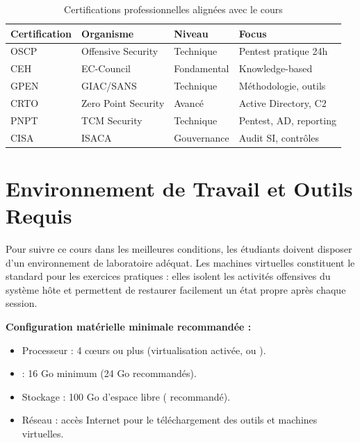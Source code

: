 \begin{table}[htbp]
\centering
\caption{Certifications professionnelles alignées avec le cours}
\label{tab:certifications}
\begin{tabular}{llll}
\toprule
\textbf{Certification} & \textbf{Organisme} & \textbf{Niveau} & \textbf{Focus} \\
\midrule
OSCP   & Offensive Security & Technique    & Pentest pratique 24h \\
CEH    & EC-Council         & Fondamental  & Knowledge-based \\
GPEN   & GIAC/SANS          & Technique    & Méthodologie, outils \\
CRTO   & Zero Point Security & Avancé      & Active Directory, C2 \\
PNPT   & TCM Security       & Technique    & Pentest, AD, reporting \\
CISA   & ISACA              & Gouvernance  & Audit SI, contrôles \\
\bottomrule
\end{tabular}
\end{table}

\section*{Environnement de Travail et Outils Requis}

Pour suivre ce cours dans les meilleures conditions, les étudiants doivent disposer
d'un environnement de laboratoire adéquat. Les machines virtuelles constituent le
standard pour les exercices pratiques : elles isolent les activités offensives du
système hôte et permettent de restaurer facilement un état propre après chaque
session.

\medskip
\noindent\textbf{Configuration matérielle minimale recommandée :}
\begin{itemize}
    \item Processeur : 4 c\oe{}urs ou plus (virtualisation activée, 
          ou ).
    \item {} : 16 Go minimum (24 Go recommandés).
    \item Stockage : 100 Go d'espace libre ( recommandé).
    \item Réseau : accès Internet pour le téléchargement des outils et machines
          virtuelles.
\end{itemize}

